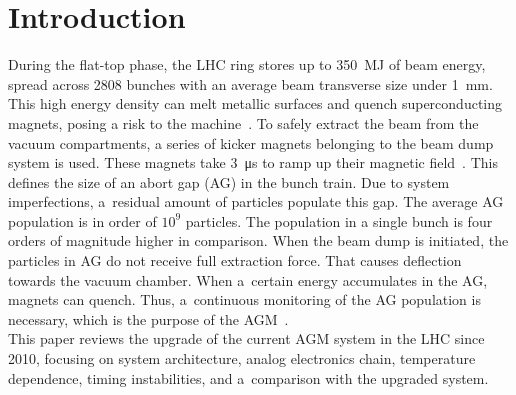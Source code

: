 \section{Introduction}
During the flat-top phase, the LHC ring stores up to \SI{350}{MJ} of beam energy,
spread across 2808 bunches with an average beam transverse size under
\SI{1}{mm}. This high energy density can melt metallic surfaces and quench
superconducting magnets, posing a risk to the machine~\cite{LHC_report}. 
To safely extract the beam from the vacuum compartments, a series of kicker
magnets belonging to the beam dump system is used. These magnets take \SI{3}{\micro\second} to
ramp up their magnetic field~\cite{beam_dump_system}. This defines the size of
an abort gap (AG) in the bunch train. Due to system imperfections, a~residual amount of particles
populate this gap. The average AG population is in order of $10^{9}$ particles. The
population in a single bunch is four orders of magnitude higher in comparison.
When the beam dump is initiated, the particles in AG do not receive full
extraction force. That causes deflection towards the vacuum chamber. When a~certain energy accumulates in the AG, magnets can quench. Thus,
a~continuous monitoring of the AG population is necessary, which is the purpose
of the AGM~\cite{particles_in_ag}.\\
This paper reviews the upgrade of the current AGM system in the LHC since 2010,
focusing on system architecture, analog electronics chain, temperature
dependence, timing instabilities, and a~comparison with the upgraded system.

